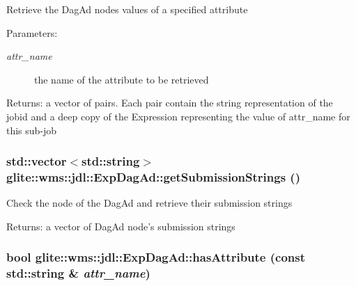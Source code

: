 Retrieve the Dag\-Ad nodes values of a specified attribute \begin{Desc}
\item[Parameters:]
\begin{description}
\item[{\em attr\_\-name}]the name of the attribute to be retrieved \end{description}
\end{Desc}
\begin{Desc}
\item[Returns:]a vector of pairs. Each pair contain the string representation of the jobid and a deep copy of the Expression representing the value of attr\_\-name for this sub-job \end{Desc}
\hypertarget{classglite_1_1wms_1_1jdl_1_1ExpDagAd_a7}{
\subsubsection[getSubmissionStrings]{\setlength{\rightskip}{0pt plus 5cm}std::vector$<$std::string$>$ glite::wms::jdl::Exp\-Dag\-Ad::get\-Submission\-Strings ()}}
\label{classglite_1_1wms_1_1jdl_1_1ExpDagAd_a7}


Check the node of the Dag\-Ad and retrieve their submission strings \begin{Desc}
\item[Returns:]a vector of Dag\-Ad node's submission strings \end{Desc}
\hypertarget{classglite_1_1wms_1_1jdl_1_1ExpDagAd_a6}{
\subsubsection[hasAttribute]{\setlength{\rightskip}{0pt plus 5cm}bool glite::wms::jdl::Exp\-Dag\-Ad::has\-Attribute (const std::string \& {\em attr\_\-name})}}
\label{classglite_1_1wms_1_1jdl_1_1ExpDagAd_a6}


